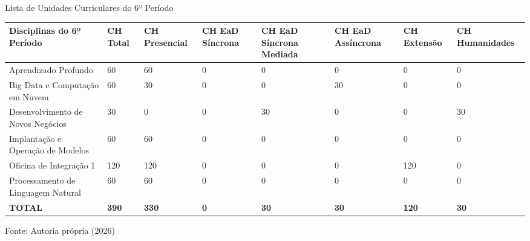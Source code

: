 \begin{quadro}[ht!]
\centering
\caption{Lista de Unidades Curriculares do 6º Período}
\label{quadro2.6}
\small
\begin{tabular}{|p{4.2cm}|p{1.2cm}|p{1.2cm}|p{1.2cm}|p{1.2cm}|p{1.2cm}|p{1.2cm}|p{1.2cm}|}
\hline
\rowcolor{gray!10} \textbf{Disciplinas do 6º Período} & \textbf{CH Total} & \textbf{CH Presencial} & \textbf{CH EaD Síncrona} & \textbf{CH EaD Síncrona Mediada} & \textbf{CH EaD Assíncrona} & \textbf{CH Extensão} & \textbf{CH Humanidades} \\ \hline
Aprendizado Profundo & 60 & 60 & 0 & 0 & 0 & 0 & 0 \\ \hline
Big Data e Computação em Nuvem & 60 & 30 & 0 & 0 & 30 & 0 & 0 \\ \hline
Desenvolvimento de Novos Negócios & 30 & 0 & 0 & 30 & 0 & 0 & 30 \\ \hline
Implantação e Operação de Modelos & 60 & 60 & 0 & 0 & 0 & 0 & 0 \\ \hline
Oficina de Integração 1 & 120 & 120 & 0 & 0 & 0 & 120 & 0 \\ \hline
Processamento de Linguagem Natural & 60 & 60 & 0 & 0 & 0 & 0 & 0 \\ \hline
\rowcolor{gray!20} \textbf{TOTAL} & \textbf{390} & \textbf{330} & \textbf{0} & \textbf{30} & \textbf{30} & \textbf{120} & \textbf{30} \\ \hline
\end{tabular}
\par\vspace{2pt}
\footnotesize{Fonte: Autoria própria (2026)}
\end{quadro}

